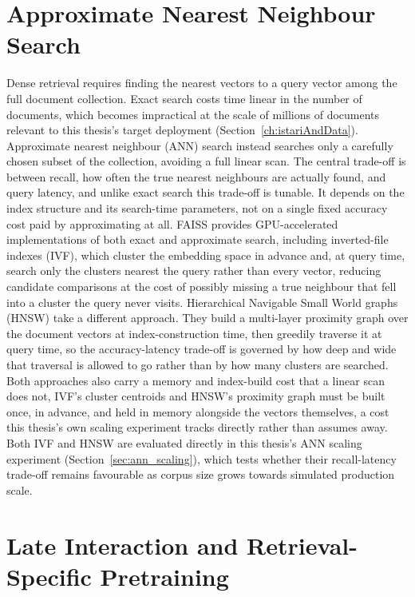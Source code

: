 \documentclass[a4paper,oneside,bibliography=totoc]{scrbook}
\begin{document}
\section{Approximate Nearest Neighbour Search}
\label{sec:lit_ann}

Dense retrieval requires finding the nearest vectors to a query vector among the full document collection. Exact search costs time linear in the number of documents, which becomes impractical at the scale of millions of documents relevant to this thesis's target deployment (Section~\ref{ch:istariAndData}). Approximate nearest neighbour (ANN) search instead searches only a carefully chosen subset of the collection, avoiding a full linear scan. The central trade-off is between recall, how often the true nearest neighbours are actually found, and query latency, and unlike exact search this trade-off is tunable. It depends on the index structure and its search-time parameters, not on a single fixed accuracy cost paid by approximating at all. FAISS \citep{johnson2017billion} provides GPU-accelerated implementations of both exact and approximate search, including inverted-file indexes (IVF), which cluster the embedding space in advance and, at query time, search only the clusters nearest the query rather than every vector, reducing candidate comparisons at the cost of possibly missing a true neighbour that fell into a cluster the query never visits. Hierarchical Navigable Small World graphs (HNSW) \citep{malkov2020efficient} take a different approach. They build a multi-layer proximity graph over the document vectors at index-construction time, then greedily traverse it at query time, so the accuracy-latency trade-off is governed by how deep and wide that traversal is allowed to go rather than by how many clusters are searched. Both approaches also carry a memory and index-build cost that a linear scan does not, IVF's cluster centroids and HNSW's proximity graph must be built once, in advance, and held in memory alongside the vectors themselves, a cost this thesis's own scaling experiment tracks directly rather than assumes away. Both IVF and HNSW are evaluated directly in this thesis's ANN scaling experiment (Section~\ref{sec:ann_scaling}), which tests whether their recall-latency trade-off remains favourable as corpus size grows towards simulated production scale.

\section{Late Interaction and Retrieval-Specific Pretraining}
\label{sec:lit_late_interaction}
\end{document}
